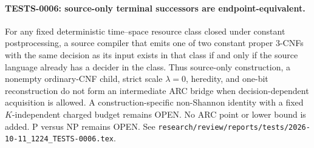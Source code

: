 \paragraph{TESTS-0006: source-only terminal successors are endpoint-equivalent.}
For any fixed deterministic time--space resource class closed under constant
postprocessing, a source compiler that emits one of two constant proper
3-CNFs with the same decision as its input exists in that class if and only if
the source language already has a decider in the class.  Thus source-only
construction, a nonempty ordinary-CNF child, strict scale $\lambda=0$,
heredity, and one-bit reconstruction do not form an intermediate ARC bridge
when decision-dependent acquisition is allowed.  A construction-specific
non-Shannon identity with a fixed $K$-independent charged budget remains
OPEN.  No ARC point or lower bound is added.  P versus NP remains OPEN.  See
\texttt{research/review/reports/tests/2026-10-11\_1224\_TESTS-0006.tex}.
